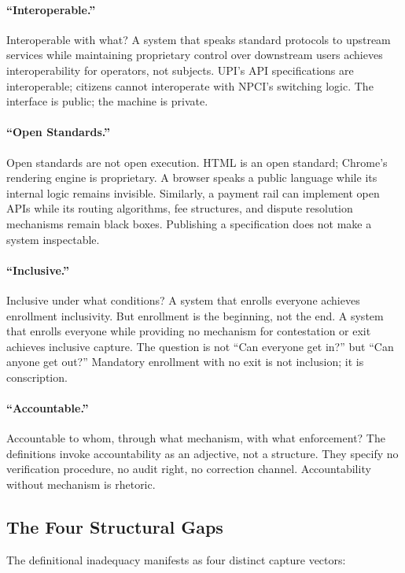 \paragraph{``Interoperable.''}  Interoperable with what? A system that speaks standard protocols to upstream services while maintaining proprietary control over downstream users achieves interoperability for operators, not subjects. UPI's API specifications are interoperable; citizens cannot interoperate with NPCI's switching logic. The interface is public; the machine is private.

\paragraph{``Open Standards.''}  Open standards are not open execution. HTML is an open standard; Chrome's rendering engine is proprietary. A browser speaks a public language while its internal logic remains invisible. Similarly, a payment rail can implement open APIs while its routing algorithms, fee structures, and dispute resolution mechanisms remain black boxes. Publishing a specification does not make a system inspectable.

\paragraph{``Inclusive.''}  Inclusive under what conditions? A system that enrolls everyone achieves enrollment inclusivity. But enrollment is the beginning, not the end. A system that enrolls everyone while providing no mechanism for contestation or exit achieves inclusive capture. The question is not ``Can everyone get in?'' but ``Can anyone get out?'' Mandatory enrollment with no exit is not inclusion; it is conscription.

\paragraph{``Accountable.''}  Accountable to whom, through what mechanism, with what enforcement? The definitions invoke accountability as an adjective, not a structure. They specify no verification procedure, no audit right, no correction channel. Accountability without mechanism is rhetoric.

\subsection{The Four Structural Gaps}

The definitional inadequacy manifests as four distinct capture vectors:

